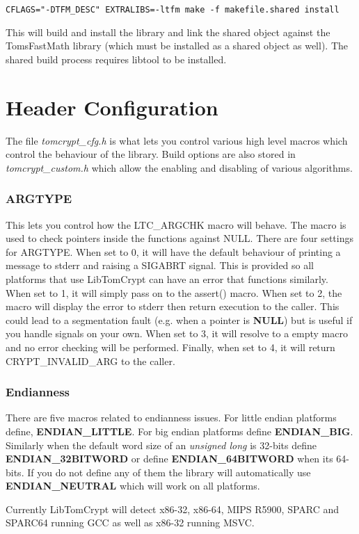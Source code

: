 \documentclass[synpaper]{book}
\newcommand{\mysection}[1]    %
	{                   %
	\section{#1}
   \markboth{\textsf{www.libtom.org}}{\thesection ~ {#1}}
	}
\begin{document}
\begin{verbatim}
CFLAGS="-DTFM_DESC" EXTRALIBS=-ltfm make -f makefile.shared install
\end{verbatim}

This will build and install the library and link the shared object against the TomsFastMath library (which must be installed as a shared object as well).  The 
shared build process requires libtool to be installed.

\mysection{Header Configuration}
The file \textit{tomcrypt\_cfg.h} is what lets you control various high level macros which control the behaviour of the library.  Build options are also
stored in \textit{tomcrypt\_custom.h} which allow the enabling and disabling of various algorithms.

\subsubsection{ARGTYPE}
This lets you control how the LTC\_ARGCHK macro will behave.  The macro is used to check pointers inside the functions against
NULL.  There are four settings for ARGTYPE.  When set to 0, it will have the default behaviour of printing a message to 
stderr and raising a SIGABRT signal.  This is provided so all platforms that use LibTomCrypt can have an error that functions
similarly.  When set to 1, it will simply pass on to the assert() macro.  When set to 2, the macro will display the error to
stderr then return execution to the caller.  This could lead to a segmentation fault (e.g. when a pointer is \textbf{NULL}) but is useful
if you handle signals on your own.  When set to 3, it will resolve to a empty macro and no error checking will be performed.  Finally, when set
to 4, it will return CRYPT\_INVALID\_ARG to the caller.  

\subsubsection{Endianness}
There are five macros related to endianness issues.  For little endian platforms define, \textbf{ENDIAN\_LITTLE}.  For big endian
platforms define \textbf{ENDIAN\_BIG}.  Similarly when the default word size of an \textit{unsigned long} is 32-bits define \textbf{ENDIAN\_32BITWORD}
or define \textbf{ENDIAN\_64BITWORD} when its 64-bits.  If you do not define any of them the library will automatically use \textbf{ENDIAN\_NEUTRAL}
which will work on all platforms.

Currently LibTomCrypt will detect x86-32, x86-64, MIPS R5900, SPARC and SPARC64 running GCC as well as x86-32 running MSVC.  
\end{document}
